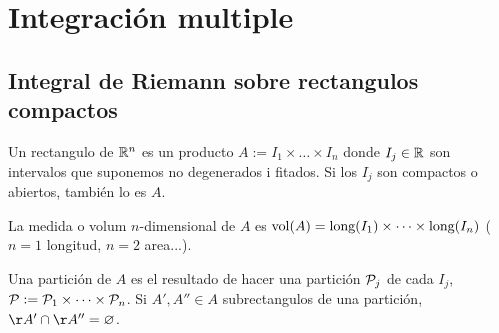 \section{Integración multiple}

\subsection{Integral de Riemann sobre rectangulos compactos}

\begin{defi}
    Un rectangulo de $\mathbb{R}^n$ es un producto $A := I_1 \times \dots \times I_n$ donde $I_j \in \mathbb{R}$ son intervalos que suponemos no degenerados i fitados. Si los $I_j$ son compactos o abiertos, también lo es $A$.
\end{defi}
\begin{defi}
    La medida o volum $n$-dimensional de $A$ es $\operatorname{vol}(A) = \text{long} (I_1) \times \dots \times \text{long} (I_n)$ ($n = 1$ longitud, $n=2$ area...).
\end{defi}
\begin{defi}
    Una partición de $A$ es el resultado de hacer una partición $\mathcal{P}_j$ de cada $I_j$, $\mathcal{P} := \mathcal{P}_1 \times \dots \times \mathcal{P}_n$. Si $A', A'' \in A$ subrectangulos de una partición, $\AA' \cap \AA'' = \emptyset$.
\end{defi}
